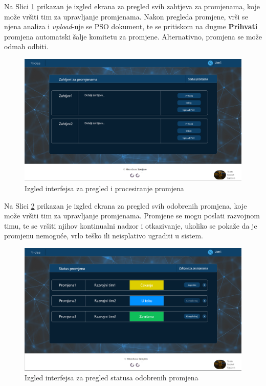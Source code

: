 \documentclass[12pt,a4paper]{article}
\begin{document}
\newpage

Na Slici \ref{pt3} prikazan je izgled ekrana za pregled svih zahtjeva za promjenama, koje može vršiti tim za upravljanje promjenama. Nakon pregleda promjene, vrši se njena analiza i \textit{upload}-uje se PSO dokument, te se pritiskom na dugme \textbf{Prihvati} promjena automatski šalje komitetu za promjene. Alternativno, promjena se može odmah odbiti.

\begin{figure}[H]
\center
\includegraphics[scale=0.4]{../res/Prototype/Zahtjev-promjene.PNG}
\caption{Izgled interfejsa za pregled i procesiranje promjena}
\label{pt3}
\end{figure}

Na Slici \ref{pt4} prikazan je izgled ekrana za pregled svih odobrenih promjena, koje može vršiti tim za upravljanje promjenama. Promjene se mogu poslati razvojnom timu, te se vršiti njihov kontinualni nadzor i otkazivanje, ukoliko se pokaže da je promjenu nemoguće, vrlo teško ili neisplativo ugraditi u sistem.

\begin{figure}[H]
\center
\includegraphics[scale=0.4]{../res/Prototype/Status-promjene.PNG}
\caption{Izgled interfejsa za pregled statusa odobrenih promjena}
\label{pt4}
\end{figure}
\end{document}

